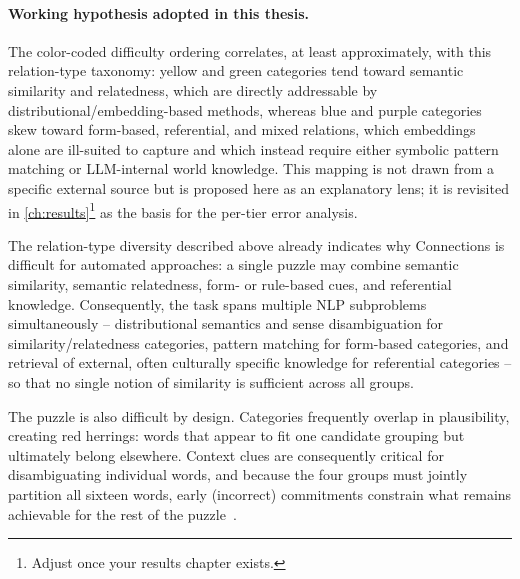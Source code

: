 \paragraph{Working hypothesis adopted in this thesis.}
The color-coded difficulty ordering correlates, at least approximately,
with this relation-type taxonomy: yellow and green categories tend toward
semantic similarity and relatedness, which are directly addressable by
distributional/embedding-based methods, whereas blue and purple
categories skew toward form-based, referential, and mixed relations,
which embeddings alone are ill-suited to capture and which instead
require either symbolic pattern matching or LLM-internal world knowledge.
This mapping is not drawn from a specific external source but is proposed
here as an explanatory lens; it is revisited in
\autoref{ch:results}\footnote{Adjust once your results chapter
exists.} as the basis for the per-tier error analysis.

\label{sec:challenges}

The relation-type diversity described above already indicates why
Connections is difficult for automated approaches: a single puzzle may
combine semantic similarity, semantic relatedness, form- or rule-based
cues, and referential knowledge. Consequently, the task spans multiple
NLP subproblems simultaneously -- distributional semantics and sense
disambiguation for similarity/relatedness categories, pattern matching
for form-based categories, and retrieval of external, often culturally
specific knowledge for referential categories -- so that no single notion
of similarity is sufficient across all groups.

The puzzle is also difficult by design. Categories frequently overlap in
plausibility, creating red herrings: words that appear to fit one
candidate grouping but ultimately belong elsewhere. Context clues are
consequently critical for disambiguating individual words, and because
the four groups must jointly partition all sixteen words, early
(incorrect) commitments constrain what remains achievable for the rest of
the puzzle~\cite{nyt-tips-tricks-2023}.

